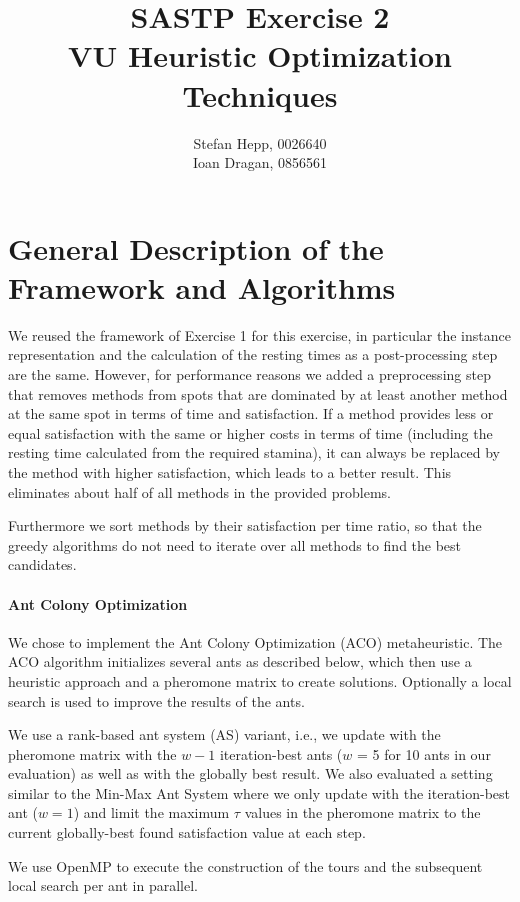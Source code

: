 \documentclass{article}
\title{SASTP Exercise 2\\
{VU Heuristic Optimization Techniques} }
\author{Stefan Hepp, 0026640 \\
Ioan Dragan, 0856561 }
\begin{document}
\maketitle
\section{General Description of the Framework and Algorithms}

We reused the framework of Exercise 1 for this exercise, in particular the instance representation and the calculation of the resting times
as a post-processing step are the same. However, for performance reasons we added a preprocessing step that removes methods from spots that
are dominated by at least another method at the same spot in terms of time and satisfaction. If a method provides less or equal satisfaction
with the same or higher costs in terms of time (including the resting time calculated from the required stamina), it can always be replaced
by the method with higher satisfaction, which leads to a better result. This eliminates about half of all methods in the provided problems. 

Furthermore we sort methods by their satisfaction per time ratio, so that the greedy algorithms do not need to iterate over all methods to find the best candidates.

\paragraph{Ant Colony Optimization}

We chose to implement the Ant Colony Optimization (ACO) metaheuristic. The ACO algorithm initializes several ants as described below, which
then use a heuristic approach and a pheromone matrix to create solutions. Optionally a local search is used to improve the results of the
ants. 

We use a rank-based ant system (AS) variant, i.e., we update with the pheromone matrix with the $w-1$ iteration-best ants ($w$ = 5 for 10 ants in our
evaluation) as well as with the globally best result. We also evaluated a setting similar to the Min-Max Ant System where we only update
with the iteration-best ant ($w=1$) and limit the maximum $\tau$ values in the pheromone matrix to the current globally-best found
satisfaction value at each step.

We use OpenMP to execute the construction of the tours and the subsequent local search per ant in parallel.
\end{document}
